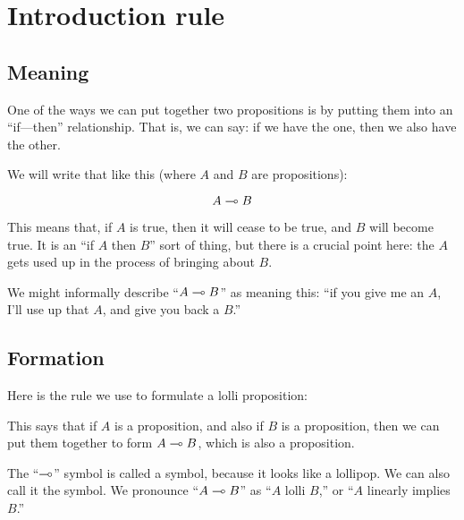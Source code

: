 \documentclass[../../../main.tex]{subfiles}
\begin{document}
\chapter{Introduction rule}



\section{Meaning}

One of the ways we can put together two propositions is by putting them into an ``if---then'' relationship. That is, we can say: if we have the one, then we also have the other. 

We will write that like this (where $A$ and $B$ are propositions):

\begin{equation*}
  A \lolli/ B
\end{equation*}

\noindent
This means that, if $A$ is true, then it will cease to be true, and $B$ will become true. It is an ``if $A$ then $B$'' sort of thing, but there is a crucial point here: the $A$ gets used up in the process of bringing about $B$. 

We might informally describe ``$A \lolli/ B$'' as meaning this: ``if you give me an $A$, I'll use up that $A$, and give you back a $B$.'' 


\section{Formation}

Here is the rule we use to formulate a lolli proposition:

\begin{prooftree*}
\end{prooftree*}

\noindent
This says that if $A$ is a proposition, and also if $B$ is a proposition, then we can put them together to form $A \lolli/ B$, which is also a proposition.

The ``$\lolli/$'' symbol is called a  symbol, because it looks like a lollipop. We can also call it the  symbol. We pronounce ``$A \lolli/ B$'' as ``$A$ lolli $B$,'' or ``$A$ linearly implies $B$.'' 
\end{document}
